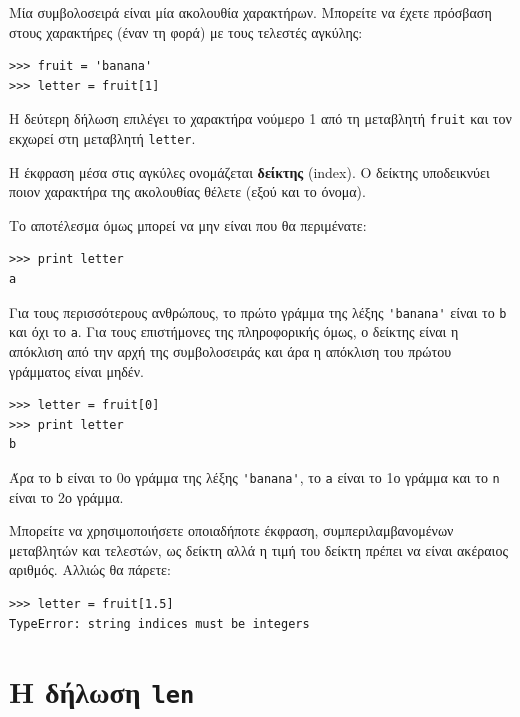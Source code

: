 \documentclass[10pt]{book}
\begin{document}
Μία συμβολοσειρά είναι μία ακολουθία χαρακτήρων.
Μπορείτε να έχετε πρόσβαση στους χαρακτήρες (έναν τη φορά) με τους
τελεστές αγκύλης:

\begin{verbatim}
>>> fruit = 'banana'
>>> letter = fruit[1]
\end{verbatim}
%

Η δεύτερη δήλωση επιλέγει το χαρακτήρα νούμερο 1 από τη μεταβλητή 
{\tt fruit} και τον εκχωρεί στη μεταβλητή {\tt letter}.

Η έκφραση μέσα στις αγκύλες ονομάζεται {\bf δείκτης} (index). 
Ο δείκτης υποδεικνύει ποιον χαρακτήρα της ακολουθίας θέλετε (εξού και το όνομα).

Το αποτέλεσμα όμως μπορεί να μην είναι που θα περιμένατε:

\begin{verbatim}
>>> print letter
a
\end{verbatim}
%

Για τους περισσότερους ανθρώπους, το πρώτο γράμμα της λέξης \verb"'banana'"
είναι το {\tt b} και όχι το {\tt a}. Για τους επιστήμονες της πληροφορικής όμως,
ο δείκτης είναι η απόκλιση από την αρχή της συμβολοσειράς και άρα η απόκλιση του πρώτου γράμματος είναι μηδέν.  

\begin{verbatim}
>>> letter = fruit[0]
>>> print letter
b
\end{verbatim}
%

Άρα το {\tt b} είναι το 0ο γράμμα της λέξης \verb"'banana'", το
{\tt a} είναι το 1ο γράμμα και το {\tt n} είναι το 2ο γράμμα.

Μπορείτε να χρησιμοποιήσετε οποιαδήποτε έκφραση, συμπεριλαμβανομένων μεταβλητών και τελεστών, ως δείκτη αλλά η τιμή του δείκτη πρέπει να είναι ακέραιος αριθμός. Αλλιώς θα πάρετε:

\begin{verbatim}
>>> letter = fruit[1.5]
TypeError: string indices must be integers
\end{verbatim}
%


\section{Η δήλωση \tt len}
\end{document}

